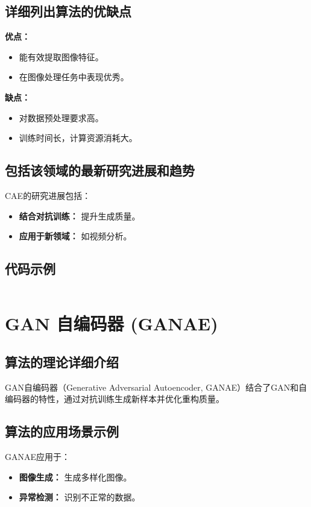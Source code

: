 \subsection*{详细列出算法的优缺点}
\textbf{优点：}
\begin{itemize}
    \item 能有效提取图像特征。
    \item 在图像处理任务中表现优秀。
\end{itemize}

\textbf{缺点：}
\begin{itemize}
    \item 对数据预处理要求高。
    \item 训练时间长，计算资源消耗大。
\end{itemize}

\subsection*{包括该领域的最新研究进展和趋势}
CAE的研究进展包括：
\begin{itemize}
    \item \textbf{结合对抗训练：} 提升生成质量。
    \item \textbf{应用于新领域：} 如视频分析。
\end{itemize}
\subsection*{代码示例}
\begin{lstlisting}

\end{lstlisting}


\section{GAN 自编码器 (GANAE)}
\subsection*{算法的理论详细介绍}
GAN自编码器（Generative Adversarial Autoencoder, GANAE）结合了GAN和自编码器的特性，通过对抗训练生成新样本并优化重构质量。

\subsection*{算法的应用场景示例}
GANAE应用于：
\begin{itemize}
    \item \textbf{图像生成：} 生成多样化图像。
    \item \textbf{异常检测：} 识别不正常的数据。
\end{itemize}

